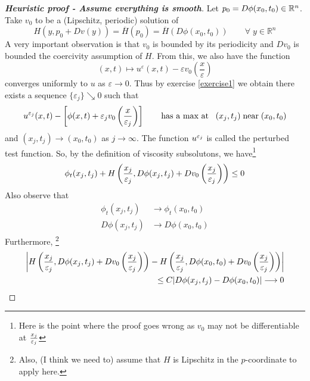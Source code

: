 \documentclass[12pt, oneside]{amsart}  	%
\begin{document}
\begin{proof}[\textbf{Heuristic proof - Assume everything is smooth}]\quad
Let $p_0=D\phi(x_0, t_0)\in \mathbb{R}^n$. Take $v_0$ to be a (Lipschitz, periodic) solution of
\begin{equation}\label{assume v is smooth solution of cell Ep0}
H(y, p_0 + Dv(y))=\overline{H}(p_0)=\overline{H}(D\phi(x_0, t_0))\qquad\forall\; y\in \mathbb{R}^n
\end{equation}
A very important observation is that $v_0$ is bounded by its periodicity and $Dv_0$ is bounded the coercivity assumption of $H$. From this, we also have the function
\begin{equation*}
(x,t)\longmapsto  u^{\varepsilon}(x,t) - \varepsilon v_0\left(\frac{x}{\varepsilon}\right)
\end{equation*}
converges uniformly to $u$ as $\varepsilon\longrightarrow 0$. Thus by exercise \ref{exercise1} we obtain there exists a sequence $\{\varepsilon_j\} \searrow 0$ such that
\begin{equation}\label{heuristic-leq 0}
u^{\varepsilon_j}(x, t) -\left[ \phi(x, t) + \varepsilon_j v_0\left(\frac{x}{\varepsilon_j}\right)\right] \qquad\text{has a max at}\;\;\; (x_j, t_j)\;\text{near}\;(x_0,t_0)
\end{equation}
and $(x_j,t_j)\longrightarrow (x_0,t_0)$ as $j\longrightarrow \infty$. The function $u^{\varepsilon_j}$ is called the perturbed test function. So, by the definition of viscosity subsolutons, we have\footnote{Here is the point where the proof goes wrong as $v_0$ may not be differentiable at $\frac{x_j}{\varepsilon_j}$}
\begin{equation*}
\phi_t(x_j, t_j) + H\left(\frac{x_j}{\varepsilon_j}, D\phi(x_j, t_j) + Dv_0\left(\frac{x_j}{\varepsilon_j}\right)\right)\leq 0
\end{equation*}
Also observe that 
\begin{align*}
\phi_t(x_j, t_j) &\longrightarrow \phi_t(x_0, t_0)\\
D\phi(x_j, t_j)&\longrightarrow  D\phi(x_0, t_0)
\end{align*}
Furthermore, \footnote{Also, (I think we need to) assume that $H$ is Lipschitz in the $p$-coordinate to apply here.}
\begin{align*}
\left|H\left(\frac{x_j}{\varepsilon_j}, D\phi(x_j, t_j) + Dv_0\left(\frac{x_j}{\varepsilon_j}\right)\right)-H\left(\frac{x_j}{\varepsilon_j}, D\phi(x_0, t_0) + Dv_0\left(\frac{x_j}{\varepsilon_j}\right)\right)\right| \\
\le C|D\phi(x_j, t_j) - D\phi(x_0, t_0)| \longrightarrow 0
\end{align*}

\end{proof}
\end{document}
